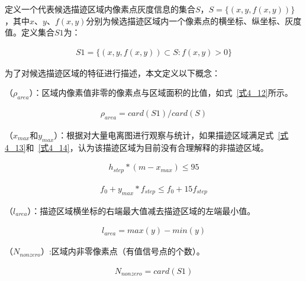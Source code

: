 定义一个代表候选描迹区域内像素点灰度信息的集合$S$，$S=\{(x,y,f(x,y))\}$，其中$x$、$y$、$f(x,y)$分别为候选描迹区域内一个像素点的横坐标、纵坐标、灰度值。定义集合$S1$为：
\begin{linenomath}
\begin{align}
 S1=\{ {(x,y,f(x,y))}\subset S: f(x,y)>0 \}
\label{式4_11}
\end{align}
\end{linenomath}
 
 
为了对候选描迹区域的特征进行描述，本文定义以下概念：
\begin{enumerate}  
 
（${\rho}_{area}$）：区域内像素值非零的像素点与区域面积的比值，如式~\ref{式4_12}所示。
\begin{linenomath}
\begin{align}
 {\rho}_{area}=card(S1)/card(S)
\label{式4_12}
\end{align}
\end{linenomath}

（$x_{max}$和$y_{max}$）：根据对大量电离图进行观察与统计，如果描迹区域满足式~\ref{式4_13}和~\ref{式4_14}，认为该描迹区域为目前没有合理解释的非描迹区域。
\begin{linenomath}
\begin{align}
 h_{step}*(m-x_{max}) \leq 95
\label{式4_13}
\end{align}
\end{linenomath}
\begin{linenomath}
\begin{align}
 f_{0}+y_{max}*f_{step}\leq f_{0}+15f_{step}
\label{式4_14}
\end{align}
\end{linenomath}

（$l_{area}$）：描迹区域横坐标的右端最大值减去描迹区域的左端最小值。
\begin{linenomath}
\begin{align}
  l_{area}=max⁡(y)-min⁡(y)
\label{式4_15}
\end{align}
\end{linenomath}



（$N_{nonzero}$）:区域内非零像素点（有值信号点的个数）。
\begin{linenomath}
\begin{align}
  N_{nonzero}=card(S1)
\label{式4_16}
\end{align}
\end{linenomath}

\end{enumerate}  
  
